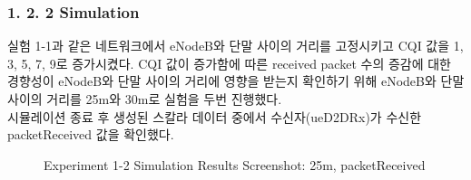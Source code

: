     \subsubsection*{1. 2. 2 Simulation}
    \vspace{-3mm}
        실험 1-1과 같은 네트워크에서 eNodeB와 단말 사이의 거리를 고정시키고 CQI 값을 1, 3, 5, 7, 9로 증가시켰다. CQI 값이 증가함에 따른 received packet 수의 증감에 대한 경향성이  eNodeB와 단말 사이의 거리에 영향을 받는지 확인하기 위해 eNodeB와 단말 사이의 거리를 25m와 30m로 실험을 두번 진행했다. \\
        시뮬레이션 종료 후 생성된 스칼라 데이터 중에서 수신자(ueD2DRx)가 수신한 packetReceived 값을 확인했다.
\newpage
            \begin{figure}[h!]
            \centering
            \hspace{3mm}
            \hspace{3mm}
            \hspace{3mm}
            \hspace{3mm}
            \hspace{3mm}
            \caption{Experiment 1-2 Simulation Results Screenshot: 25m, packetReceived}
            \end{figure}
            
